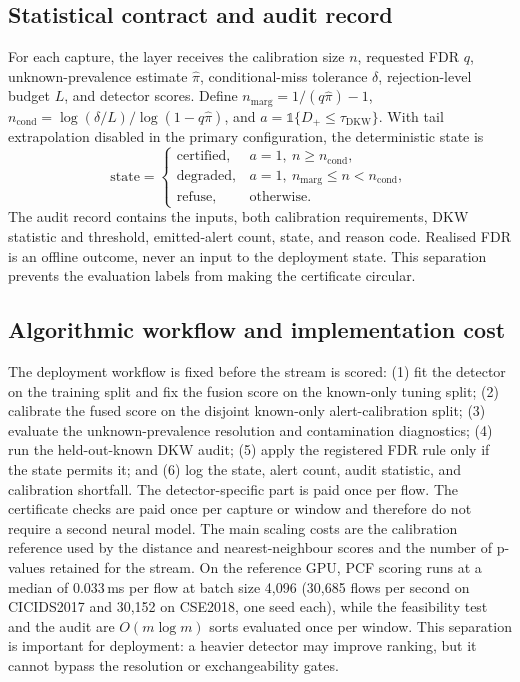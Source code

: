 \documentclass[a4paper,fleqn]{cas-dc}
\newcommand{\PCF}{PCF\xspace}
\begin{document}
\subsection{Statistical contract and audit record}
For each capture, the layer receives the calibration size $n$, requested FDR $q$, unknown-prevalence estimate $\hat\pi$, conditional-miss tolerance $\delta$, rejection-level budget $L$, and detector scores. Define $n_{\mathrm{marg}}=1/(q\hat\pi)-1$, $n_{\mathrm{cond}}=\log(\delta/L)/\log(1-q\hat\pi)$, and $a=\mathbb{1}\{D_+\leq\tau_{\mathrm{DKW}}\}$. With tail extrapolation disabled in the primary configuration, the deterministic state is
\begin{equation}
 \mathrm{state}=\begin{cases}
 \mathrm{certified}, & a=1,\ n\geq n_{\mathrm{cond}},\\
 \mathrm{degraded}, & a=1,\ n_{\mathrm{marg}}\leq n<n_{\mathrm{cond}},\\
 \mathrm{refuse}, & \text{otherwise}.
 \end{cases}
 \label{eq:state}
\end{equation}
The audit record contains the inputs, both calibration requirements, DKW statistic and threshold, emitted-alert count, state, and reason code. Realised FDR is an offline outcome, never an input to the deployment state. This separation prevents the evaluation labels from making the certificate circular.

\subsection{Algorithmic workflow and implementation cost}
The deployment workflow is fixed before the stream is scored: (1) fit the detector on the training split and fix the fusion score on the known-only tuning split; (2) calibrate the fused score on the disjoint known-only alert-calibration split; (3) evaluate the unknown-prevalence resolution and contamination diagnostics; (4) run the held-out-known DKW audit; (5) apply the registered FDR rule only if the state permits it; and (6) log the state, alert count, audit statistic, and calibration shortfall. The detector-specific part is paid once per flow. The certificate checks are paid once per capture or window and therefore do not require a second neural model. The main scaling costs are the calibration reference used by the distance and nearest-neighbour scores and the number of p-values retained for the stream. On the reference GPU, \PCF scoring runs at a median of 0.033\,ms per flow at batch size 4,096 (30,685 flows per second on CICIDS2017 and 30,152 on CSE2018, one seed each), while the feasibility test and the audit are $O(m\log m)$ sorts evaluated once per window. This separation is important for deployment: a heavier detector may improve ranking, but it cannot bypass the resolution or exchangeability gates.
\end{document}

